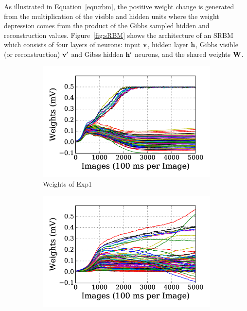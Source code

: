 As illustrated in Equation~\ref{equ:rbm}, the positive weight change is generated from the multiplication of the visible and hidden units where the weight depression comes from the product of the Gibbs sampled hidden and reconstruction values.
Figure~\ref{fig:sRBM} shows the architecture of an SRBM which consists of four layers of neurons: input $\bf{v}$, hidden layer $\bf{h}$, Gibbs visible (or reconstruction) $\bf{v'}$ and Gibss hidden $\bf{h'}$ neurons, and the shared weights $\bf{W}$.

\begin{figure}
	\centering
	\begin{subfigure}[t]{0.48\textwidth}
		\includegraphics[width=\textwidth]{pics_sdlm/10_exp_SRBM_Orig/exp1_weights_s.png}
		\caption{Weights of Exp1}
	\end{subfigure}
	\begin{subfigure}[t]{0.48\textwidth}
		\includegraphics[width=\textwidth]{pics_sdlm/10_exp_SRBM_Orig/exp2_weights_s.png}

\end{subfigure}
\end{figure}
